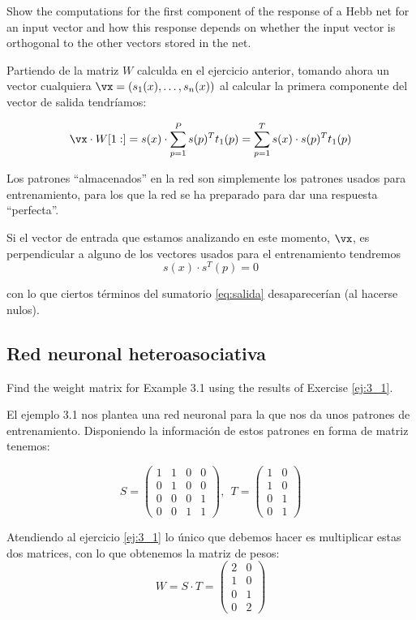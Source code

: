 \begin{problem}[2]
Show the computations for the first component of the response of a Hebb net for an input vector and how this response depends on whether the input vector is orthogonal to the other vectors stored in the net.
\solution


Partiendo de la matriz $W$ calculda en el ejercicio anterior, tomando ahora un vector cualquiera $\vx = (s_1(x),\ldots, s_n(x))$ al calcular la primera componente del vector de salida tendríamos:

\begin{equation}\label{eq:salida}
\vx \cdot W[1:] = s(x) \cdot \sum_{p=1}^Ps(p)^Tt_1(p) = \sum_{p=1}^Ts(x)\cdot s(p)^Tt_1(p)
\end{equation}

Los patrones ``almacenados'' en la red son simplemente los patrones usados para entrenamiento, para los que la red se ha preparado para dar una respuesta ``perfecta''.

Si el vector de entrada que estamos analizando en este momento, $\vx$, es perpendicular a alguno de los vectores usados para el entrenamiento tendremos
\[s(x)\cdot s^T(p) = 0\]

con lo que ciertos términos del sumatorio \ref{eq:salida} desaparecerían (al hacerse nulos).

\end{problem}

\subsection{Red neuronal heteroasociativa}

\begin{problem}[3]
Find the weight matrix for Example 3.1 using the results of Exercise \ref{ej:3_1}.
\solution


El ejemplo 3.1 nos plantea una red neuronal para la que nos da unos patrones de entrenamiento. Disponiendo la información de estos patrones en forma de matriz tenemos:

\[S = \left( \begin{array}{cccc}
1 & 1 & 0 & 0\\
0 & 1 & 0 & 0\\
0 & 0 & 0 & 1\\
0 & 0 & 1 & 1
\end{array}\right), \ \ T = \left( \begin{array}{cc}
1 & 0 \\
1 & 0 \\
0 & 1 \\
0 & 1
\end{array}\right)\]

Atendiendo al ejercicio \ref{ej:3_1} lo único que debemos hacer es multiplicar estas dos matrices, con lo que obtenemos la matriz de pesos:
\[W = S\cdot T = \left( \begin{array}{cc}
2 & 0 \\
1 & 0 \\
0 & 1 \\
0 & 2
\end{array}\right)\]

\end{problem}

